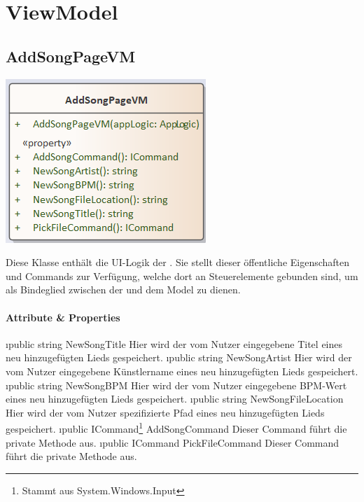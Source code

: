 \documentclass[../entwurf.tex]{subfiles}
\begin{document}
\section{ViewModel}
\subsection{AddSongPageVM}
\begin{minipage}{0.45\textwidth}
\includegraphics[scale=0.75]{../graphics/vm_klassen/AddSongPageVM.png}
\end{minipage}
\begin{minipage}{0.55\textwidth}
Diese Klasse enthält die UI-Logik der . Sie stellt dieser öffentliche Eigenschaften und Commands zur Verfügung, welche dort an Steuerelemente gebunden sind, um als Bindeglied zwischen der  und dem Model zu dienen.
\end{minipage}
\paragraph{Attribute \& Properties}
\begin{itemize}
	\i{public string NewSongTitle} Hier wird der vom Nutzer eingegebene Titel eines neu hinzugefügten Lieds gespeichert.
	\i{public string NewSongArtist} Hier wird der vom Nutzer eingegebene Künstlername eines neu hinzugefügten Lieds gespeichert.
	\i{public string NewSongBPM} Hier wird der vom Nutzer eingegebene BPM-Wert eines neu hinzugefügten Lieds gespeichert.
	\i{public string NewSongFileLocation} Hier wird der vom Nutzer spezifizierte Pfad eines neu hinzugefügten Lieds gespeichert.
	\i{public ICommand\footnote{Stammt aus System.Windows.Input} AddSongCommand} Dieser Command führt die private Methode  aus. 
	\i{public ICommand PickFileCommand} Dieser Command führt die private Methode  aus. 
\end{itemize}
\end{document}

